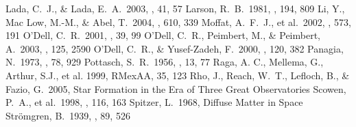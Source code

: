\documentclass[proceedings, preprint]{rmaa}
\begin{document}
\begin{thebibliography}
Lada, C.~J., \& Lada, E.~A.\ 2003, \araa, 41, 57 
Larson, R.~B.\ 1981, \mnras, 194, 809 
Li, Y., Mac Low, M.-M., \& Abel, T.\ 2004, \apj, 610, 339 
Moffat, A.~F.~J., et  al.\ 2002, \apj, 573, 191 
O'Dell, C.~R.\ 2001, \araa, 39, 99 
O'Dell, C.~R., Peimbert, M., \& Peimbert, A.\ 2003, \aj, 125, 2590 
O'Dell, C.~R.,  \& Yusef-Zadeh, F.\ 2000, \aj, 120, 382 
Panagia, N.\ 1973, \aj, 78, 929 
Pottasch, S.~R.\ 1956, \bain,  13, 77 
Raga, A. C., Mellema, G., Arthur, S.J., et al.  1999, RMexAA, 35, 123
Rho, J., Reach, W.~T., Lefloch, B., \& Fazio, G.\ 2005, 
Star Formation in the Era of Three Great Observatories
Scowen, P.~A., et al.\ 1998, \aj, 116, 163 
Spitzer, L.\ 1968, Diffuse Matter in Space
Str{\"o}mgren, B.\ 1939,  \apj, 89, 526 
\end{thebibliography}
\end{document}
